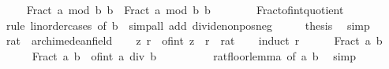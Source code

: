 \begin{isabellebody}
\ \isamarkupfalse%
\ {\isachardoublequoteopen}{}\ {\isasymle}\ Fract\ {\isacharparenleft}{\kern0pt}a\ mod\ b{\isacharparenright}{\kern0pt}\ b\ {\isasymand}\ Fract\ {\isacharparenleft}{\kern0pt}a\ mod\ b{\isacharparenright}{\kern0pt}\ b\ {\isacharless}{\kern0pt}\ {}{\isachardoublequoteclose}\isanewline
\ \ \ \ \isamarkupfalse%
\ Fract{\isacharunderscore}{\kern0pt}of{\isacharunderscore}{\kern0pt}int{\isacharunderscore}{\kern0pt}quotient\isanewline
\ \ \ \ \isamarkupfalse%
\ {\isacharparenleft}{\kern0pt}rule\ linorder{\isacharunderscore}{\kern0pt}cases\ {\isacharbrackleft}{\kern0pt}of\ b\ {}{\isacharbrackright}{\kern0pt}{\isacharparenright}{\kern0pt}\ {\isacharparenleft}{\kern0pt}simp{\isacharunderscore}{\kern0pt}all\ add{\isacharcolon}{\kern0pt}\ divide{\isacharunderscore}{\kern0pt}nonpos{\isacharunderscore}{\kern0pt}neg{\isacharparenright}{\kern0pt}\isanewline
\ \ \isamarkupfalse%
\ \isamarkupfalse%
\ {\isacharquery}{\kern0pt}thesis\ \isamarkupfalse%
\ simp\isanewline
{}\isamarkupfalse%
%
\endisatagproof
{\isafoldproof}%
%
\isadelimproof
\isanewline
%
\endisadelimproof
\isanewline
{}\isamarkupfalse%
\ rat\ {\isacharcolon}{\kern0pt}{\isacharcolon}{\kern0pt}\ archimedean{\isacharunderscore}{\kern0pt}field\isanewline
%
\isadelimproof
%
\endisadelimproof
%
\isatagproof
{}\isamarkupfalse%
\isanewline
\ \ \isamarkupfalse%
\ {\isachardoublequoteopen}{\isasymexists}z{\isachardot}{\kern0pt}\ r\ {\isasymle}\ of{\isacharunderscore}{\kern0pt}int\ z{\isachardoublequoteclose}\ \ r\ {\isacharcolon}{\kern0pt}{\isacharcolon}{\kern0pt}\ rat\isanewline
\ \ \isamarkupfalse%
\ {\isacharparenleft}{\kern0pt}induct\ r{\isacharparenright}{\kern0pt}\isanewline
\ \ \ \ \isamarkupfalse%
\ {\isacharparenleft}{\kern0pt}Fract\ a\ b{\isacharparenright}{\kern0pt}\isanewline
\ \ \ \ \isamarkupfalse%
\ {\isachardoublequoteopen}Fract\ a\ b\ {\isasymle}\ of{\isacharunderscore}{\kern0pt}int\ {\isacharparenleft}{\kern0pt}a\ div\ b\ {\isacharplus}{\kern0pt}\ {}{\isacharparenright}{\kern0pt}{\isachardoublequoteclose}\isanewline
\ \ \ \ \ \ \isamarkupfalse%
\ rat{\isacharunderscore}{\kern0pt}floor{\isacharunderscore}{\kern0pt}lemma\ {\isacharbrackleft}{\kern0pt}of\ a\ b{\isacharbrackright}{\kern0pt}\ \isamarkupfalse%
\ simp\isanewline
\ \ \ \ \isamarkupfalse%
\ \isamarkupfalse%

\end{isabellebody}
